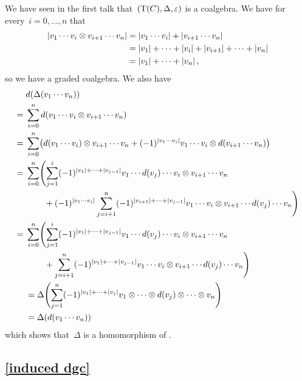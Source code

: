 We have seen in the first talk that~$(\operatorname{T}(C), \Delta, \varepsilon)$ is a coalgebra.
We have for every~$i = 0, \dotsc, n$ that
\begin{align*}
  \lvert v_1 \dotsm v_i \otimes v_{i+1} \dotsm v_n\rvert
  &=
  \lvert v_1 \dotsm v_i\rvert + \lvert v_{i+1} \dotsm v_n\rvert
  \\
  &=
  \lvert v_1\rvert + \dotsb + \lvert v_i\rvert + \lvert v_{i+1}\rvert + \dotsb + \lvert v_n\rvert
  \\
  &=
  \lvert v_1\rvert + \dotsb + \lvert v_n\rvert  \,,
\end{align*}
so we have a graded coalgebra.
We also have
\begingroup
\allowdisplaybreaks
\begin{align*}
  {}&
  d(\Delta(v_1 \dotsm v_n))
  \\
  ={}&
  \sum_{i=0}^n d(v_1 \dotsm v_i \tensor v_{i+1} \dotsm v_n)
  \\
  ={}&
  \sum_{i=0}^n
  \bigl(
      d(v_1 \dotsm v_i) \tensor v_{i+1} \dotsm v_n
    + (-1)^{\hdeg{v_1 \dotsm v_i}}
      v_1 \dotsm v_i \tensor d(v_{i+1} \dotsm v_n)
  \bigr)
  \\
  ={}&
  \sum_{i=0}^n
  \Biggl(
    \sum_{j=1}^i
    (-1)^{\hdeg{v_1} + \dotsb + \hdeg{v_{j-1}}}
    v_1 \dotsm d(v_j) \dotsm v_i \tensor v_{i+1} \dotsm v_n
  \\
  {}&
  \phantom{\sum_{i=0}^n \biggl(}
  + (-1)^{\hdeg{v_1 \dotsm v_i}}
  \sum_{j=i+1}^n
  (-1)^{\hdeg{v_{i+1}} + \dotsb + \hdeg{v_{j-1}}}
  v_1 \dotsm v_i \tensor v_{i+1} \dotsm d(v_j) \dotsm v_n
  \Biggl)
  \\
  ={}&
  \sum_{i=0}^n
  \Biggl(
    \sum_{j=1}^i
    (-1)^{\hdeg{v_1} + \dotsb + \hdeg{v_{j-1}}}
    v_1 \dotsm d(v_j) \dotsm v_i \tensor v_{i+1} \dotsm v_n
  \\
  {}&
  \phantom{\sum_{i=0}^n \biggl(}
  + \sum_{j=i+1}^n
  (-1)^{\hdeg{v_1} + \dotsb + \hdeg{v_{j-1}}}
  v_1 \dotsm v_i \tensor v_{i+1} \dotsm d(v_j) \dotsm v_n
  \Biggl)
  \\
  &=
  \Delta
  \Biggl(
    \sum_{j=1}^n
    (-1)^{\hdeg{v_1} + \dotsb + \hdeg{v_j}}
    v_1 \tensor \dotsm \tensor d(v_j) \tensor \dotsb \tensor v_n
  \Biggr)
  \\
  &=
  \Delta(d(v_1 \dotsm v_n))
  \end{align*}
  \endgroup
which shows that~$\Delta$ is a homomorphism of {\dgvs}.





\subsection{\cref{induced dgc}}
\label{induced dgc proof}

